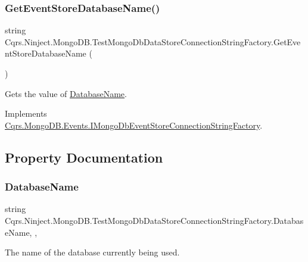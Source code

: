\subsubsection{\texorpdfstring{Get\+Event\+Store\+Database\+Name()}{GetEventStoreDatabaseName()}}
{\footnotesize\ttfamily string Cqrs.\+Ninject.\+Mongo\+D\+B.\+Test\+Mongo\+Db\+Data\+Store\+Connection\+String\+Factory.\+Get\+Event\+Store\+Database\+Name (\begin{DoxyParamCaption}{ }\end{DoxyParamCaption})}



Gets the value of \hyperlink{classCqrs_1_1Ninject_1_1MongoDB_1_1TestMongoDbDataStoreConnectionStringFactory_a53412e87f2114b8a61d6898f7f290187_a53412e87f2114b8a61d6898f7f290187}{Database\+Name}. 



Implements \hyperlink{interfaceCqrs_1_1MongoDB_1_1Events_1_1IMongoDbEventStoreConnectionStringFactory_a81ee28bfbb0e567b95f2b280bc6fb298_a81ee28bfbb0e567b95f2b280bc6fb298}{Cqrs.\+Mongo\+D\+B.\+Events.\+I\+Mongo\+Db\+Event\+Store\+Connection\+String\+Factory}.



\subsection{Property Documentation}
\mbox{\label{classCqrs_1_1Ninject_1_1MongoDB_1_1TestMongoDbDataStoreConnectionStringFactory_a53412e87f2114b8a61d6898f7f290187_a53412e87f2114b8a61d6898f7f290187}} 
\subsubsection{\texorpdfstring{Database\+Name}{DatabaseName}}
{\footnotesize\ttfamily string Cqrs.\+Ninject.\+Mongo\+D\+B.\+Test\+Mongo\+Db\+Data\+Store\+Connection\+String\+Factory.\+Database\+Name\hspace{0.3cm}{\ttfamily [static]}, {\ttfamily [get]}, {\ttfamily [set]}}



The name of the database currently being used. 

